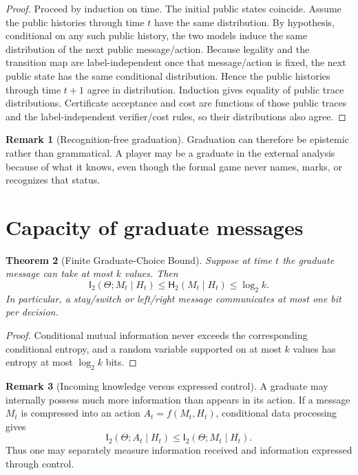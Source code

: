 \documentclass[11pt]{article}
\newtheorem{theorem}{Theorem}[section]
\theoremstyle{definition}
\newtheorem{remark}[theorem]{Remark}
\newcommand{\I}{\mathsf{I}}
\newcommand{\Hh}{\mathsf{H}}
\begin{document}
\begin{proof}
Proceed by induction on time.  The initial public states coincide.  Assume the public histories through time $t$ have the same distribution.  By hypothesis, conditional on any such public history, the two models induce the same distribution of the next public message/action.  Because legality and the transition map are label-independent once that message/action is fixed, the next public state has the same conditional distribution.  Hence the public histories through time $t+1$ agree in distribution.  Induction gives equality of public trace distributions.  Certificate acceptance and cost are functions of those public traces and the label-independent verifier/cost rules, so their distributions also agree.
\end{proof}

\begin{remark}[Recognition-free graduation]
Graduation can therefore be epistemic rather than grammatical.  A player may be a graduate in the external analysis because of what it knows, even though the formal game never names, marks, or recognizes that status.
\end{remark}

\section{Capacity of graduate messages}

\begin{theorem}[Finite Graduate-Choice Bound]
Suppose at time $t$ the graduate message can take at most $k$ values.  Then
\[
\I_2(\Theta;M_t\mid H_t)
\le
\Hh_2(M_t\mid H_t)
\le
\log_2 k.
\]
In particular, a stay/switch or left/right message communicates at most one bit per decision.
\end{theorem}

\begin{proof}
Conditional mutual information never exceeds the corresponding conditional entropy, and a random variable supported on at most $k$ values has entropy at most $\log_2 k$ bits.
\end{proof}

\begin{remark}[Incoming knowledge versus expressed control]
A graduate may internally possess much more information than appears in its action.  If a message $M_t$ is compressed into an action $A_t=f(M_t,H_t)$, conditional data processing gives
\[
\I_2(\Theta;A_t\mid H_t)
\le
\I_2(\Theta;M_t\mid H_t).
\]
Thus one may separately measure information received and information expressed through control.
\end{remark}
\end{document}
